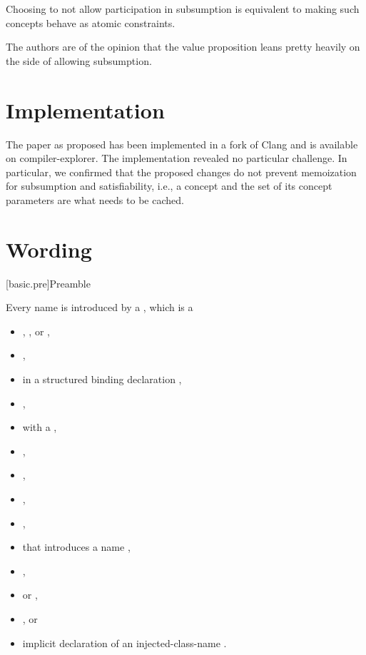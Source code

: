 \documentclass{wg21}
\begin{document}
Choosing to not allow participation in subsumption is equivalent to making such concepts behave as atomic constraints.

The authors are of the opinion that the value proposition leans pretty heavily on the side of allowing subsumption.

\section{Implementation}


The paper as proposed has been implemented in a fork of Clang and is available on compiler-explorer.
The implementation revealed no particular challenge. In particular, we confirmed that the proposed changes
do not prevent memoization for subsumption and satisfiability, i.e., a concept and the set of its concept parameters
are what needs to be cached.

\section{Wording}

[basic.pre]{Preamble}

\pnum
Every name is introduced by a , which is a
\begin{itemize}
    \item
    ,
    , or
     ,
    \item
     ,
    \item
    in a structured binding declaration ,
    \item
     ,
    \item
     with a  ,
    \item
     ,
    \item
     ,
    \item
     ,
    \item
     ,
    \item
    that introduces a name ,
    \item
     ,
    \item
     or
     ,
    \item
     , or
    \item
    implicit declaration of an injected-class-name .
\end{itemize}
\end{document}
